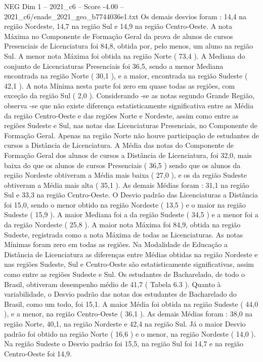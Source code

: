\begin{textsample}{NEG Dim 1 – 2021\_c6 – Score -4.00 – 2021\_c6/enade\_2021\_geo\_b7744036e1.txt}
Os demais desvios foram : 14,4 na região Nordeste, 14,7 na região Sul e 14,9 na região Centro-Oeste.
A nota Máxima no Componente de Formação Geral da prova de alunos de cursos Presenciais de Licenciatura foi 84,8, obtida por, pelo menos, um aluno na região Sul.
A menor nota Máxima foi obtida na região Norte ( 73,4 ).
A Mediana do conjunto de Licenciaturas Presenciais foi 36,5, sendo a menor Mediana encontrada na região Norte ( 30,1 ), e a maior, encontrada na região Sudeste ( 42,1 ).
A nota Mínima nesta parte foi zero em quase todas as regiões, com exceção da região Sul ( 2,0 ).
Considerando -se as notas segundo Grande Região, observa -se que não existe diferença estatisticamente significativa entre as Média da região Centro-Oeste e das regiões Norte e Nordeste, assim como entre as regiões Sudeste e Sul, nas notas das Licenciaturas Presenciais, no Componente de Formação Geral.
Apenas na região Norte não houve participação de estudantes de cursos a Distância de Licenciatura.
A Média das notas do Componente de Formação Geral dos alunos de cursos a Distância de Licenciatura, foi 32,0, mais baixa do que os alunos de cursos Presenciais ( 36,5 ) sendo que os alunos da região Nordeste obtiveram a Média mais baixa ( 27,0 ), e os da região Sudeste obtiveram a Média mais alta ( 35,1 ).
As demais Médias foram : 31,1 na região Sul e 33,3 na região Centro-Oeste.
O Desvio padrão das Licenciaturas a Distância foi 15,0, sendo o menor obtido na região Nordeste ( 13,5 ) e o maior na região Sudeste ( 15,9 ).
A maior Mediana foi a da região Sudeste ( 34,5 ) e a menor foi a da região Nordeste ( 25,8 ).
A maior nota Máxima foi 84,9, obtida na região Sudeste, registrada como a nota Máxima de todas as Licenciaturas.
As notas Mínimas foram zero em todas as regiões.
Na Modalidade de Educação a Distância de Licenciatura as diferenças entre Médias obtidas na região Nordeste e nas regiões Sudeste, Sul e Centro-Oeste são estatisticamente significativas, assim como entre as regiões Sudeste e Sul.
Os estudantes de Bacharelado, de todo o Brasil, obtiveram desempenho médio de 41,7 ( Tabela 6.3 ).
Quanto à variabilidade, o Desvio padrão das notas dos estudantes de Bacharelado do Brasil, como um todo, foi 15,1.
A maior Média foi obtida na região Sudeste ( 44,0 ), e a menor, na região Centro-Oeste ( 36,1 ).
As demais Médias foram : 38,0 na região Norte, 40,1, na região Nordeste e 42,4 na região Sul.
Já o maior Desvio padrão foi obtido na região Norte ( 16,6 ) e o menor, na região Nordeste ( 14,0 ).
Na região Sudeste o Desvio padrão foi 15,5, na região Sul foi 14,7 e na região Centro-Oeste foi 14,9.

\end{textsample}
